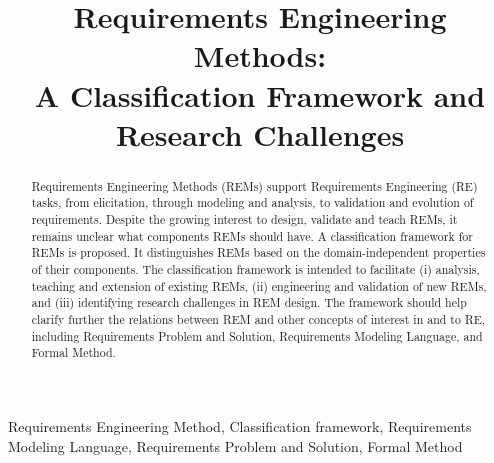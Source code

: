 \documentclass[10pt, final, conference, compsocconf]{IEEEtran}
\author{
\IEEEauthorblockN{Ivan J. Jureta}
\IEEEauthorblockA{PReCISE Research Center, University of Namur\\ ivan.jureta@fundp.ac.be}
}
\begin{document}
\theoremstyle{plain}
\newtheorem{thm}{Theorem}[section]
\newtheorem{proposition}[thm]{Proposition}
\newtheorem{corollary}[thm]{Corollary}
\newtheorem{lemma}[thm]{Lemma}
\newtheorem{definition}[thm]{Definition}
\newtheorem{convention}[thm]{Convention}

\theoremstyle{remark}
\newtheorem{remark}[thm]{Remark}
\newtheorem{example}[thm]{Example}

\newcommand{\zi}[1]{\textit{#1}}
\newcommand{\xb}[1]{\textbf{#1}}
\newcommand{\xf}[1]{\textsf{#1}}
\newcommand{\xc}[1]{\textsc{#1}}
\newcommand{\xt}[1]{\texttt{#1}}

\newcommand{\eendex}{$\blacksquare$}
\newenvironment{xexample}[1]{\begin{example}\label{#1}}{\eendex\end{example}}

\title{Requirements Engineering Methods:\\A Classification Framework and Research Challenges}

\maketitle

\thispagestyle{empty}

\begin{abstract}
Requirements Engineering Methods (REMs) support Requirements Engineering (RE) tasks, from elicitation, through modeling and analysis, to validation and evolution of requirements. Despite the growing interest to design, validate and teach REMs, it remains unclear what components REMs should have. A classification framework for REMs is proposed. It distinguishes REMs based on the domain-independent properties of their components. The classification framework is intended to facilitate (i) analysis, teaching and extension of existing REMs, (ii) engineering and validation of new REMs, and (iii) identifying research challenges in REM design. The framework should help clarify further the relations between REM and other concepts of interest in and to RE, including Requirements Problem and Solution, Requirements Modeling Language, and Formal Method.
\end{abstract}

\begin{IEEEkeywords}
Requirements Engineering Method, Classification framework, Requirements Modeling Language, Requirements Problem and Solution, Formal Method
\end{IEEEkeywords}
\end{document}
